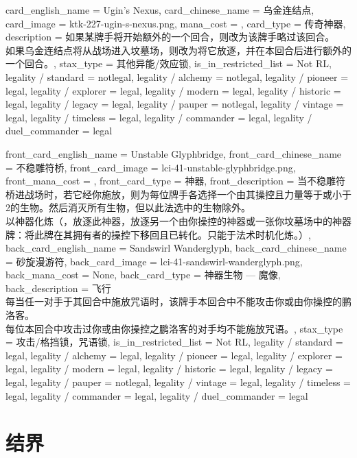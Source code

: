 \documentclass[lang = cn, color = black, 10pt]{AllThatStax}
\begin{document}
\card
{
	card_english_name = {Ugin's Nexus},
	card_chinese_name = {乌金连结点},
	card_image = ktk-227-ugin-s-nexus.png,
	mana_cost = ,
	card_type = 传奇神器,
	description = {如果某牌手将开始额外的一个回合，则改为该牌手略过该回合。\\
		如果乌金连结点将从战场进入坟墓场，则改为将它放逐，并在本回合后进行额外的一个回合。},
	stax_type = 其他异能/效应锁,
	is_in_restricted_list = Not RL,
	legality / standard = notlegal,
	legality / alchemy = notlegal,
	legality / pioneer = legal,
	legality / explorer = legal,
	legality / modern = legal,
	legality / historic = legal,
	legality / legacy = legal,
	legality / pauper = notlegal,
	legality / vintage = legal,
	legality / timeless = legal,
	legality / commander = legal,
	legality / duel_commander = legal
}

\mfcard
{
	front_card_english_name = {Unstable Glyphbridge},
	front_card_chinese_name = {不稳雕符桥},
	front_card_image = lci-41-unstable-glyphbridge.png,
	front_mana_cost = ,
	front_card_type = 神器,
	front_description = {当不稳雕符桥进战场时，若它经你施放，则为每位牌手各选择一个由其操控且力量等于或小于2的生物。然后消灭所有生物，但以此法选中的生物除外。\\
		以神器化炼（，放逐此神器，放逐另一个由你操控的神器或一张你坟墓场中的神器牌：将此牌在其拥有者的操控下移回且已转化。只能于法术时机化炼。）},
	back_card_english_name = {Sandswirl Wanderglyph},
	back_card_chinese_name = {砂旋漫游符},
	back_card_image = lci-41-sandswirl-wanderglyph.png,
	back_mana_cost = None,
	back_card_type = 神器生物 — 魔像,
	back_description = {飞行\\
		每当任一对手于其回合中施放咒语时，该牌手本回合中不能攻击你或由你操控的鹏洛客。\\
		每位本回合中攻击过你或由你操控之鹏洛客的对手均不能施放咒语。},
	stax_type = 攻击/格挡锁，咒语锁,
	is_in_restricted_list = Not RL,
	legality / standard = legal,
	legality / alchemy = legal,
	legality / pioneer = legal,
	legality / explorer = legal,
	legality / modern = legal,
	legality / historic = legal,
	legality / legacy = legal,
	legality / pauper = notlegal,
	legality / vintage = legal,
	legality / timeless = legal,
	legality / commander = legal,
	legality / duel_commander = legal
}

\section{结界}
\end{document}
